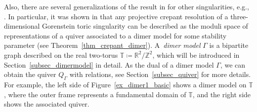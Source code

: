 \documentclass[pdftex]{sigma}
\numberwithin{equation}{section}
\theoremstyle{definition}
\newcommand{\ZZ}{\mathbb{Z}}
\newcommand{\RR}{\mathbb{R}}
\newcommand{\TT}{\mathbb{T}}
\begin{document}
Also, there are several generalizations of the result in \cite{CrawIshii} for other singularities, e.g., \cite{IU_anycrepant,Jung_CIconj,Wem_MMP}.
In particular, it was shown in \cite{IU_anycrepant} that any projective crepant resolution of a three-dimensional Gorenstein toric singularity can be
described as the moduli space of representations of a quiver associated to a dimer model for some stability parameter (see Theorem~\ref{thm_crepant_dimer}).
A~\emph{dimer model} $\Gamma$ is a bipartite graph described on the real two-torus $\TT\coloneqq\RR^2/\ZZ^2$, which will be introduced in Section~\ref{subsec_dimermodel} in detail.
As the dual of a dimer model $\Gamma$, we can obtain the quiver $Q_\Gamma$ with relations, see Section~\ref{subsec_quiver} for more details.
For example, the left side of Figure~\ref{ex_dimer1_basic} shows a dimer model on $\TT$, where the outer frame represents a fundamental domain of $\TT$, and the right side shows the associated quiver.

\newcommand{\basicdimerA}{
\foreach \n/\a/\b in {1/1.5/3, 2/3.5/3, 3/5.5/3, 4/7.5/3} {\coordinate (B\n) at (\a,\b);}
\foreach \n/\a/\b in {1/0.5/1,2/2.5/1, 3/4.5/1, 4/6.5/1} {\coordinate (W\n) at (\a,\b);}
\draw[line width=\edgewidth] (0,0) rectangle (8,4);
\foreach \w/\b in {1/1,2/2,3/3,4/3} {\draw[line width=\edgewidth] (W\w)--(B\b); };
\foreach \w/\s/\t in {1/0/2,1/0/0,1/1/0,2/2/0,2/3/0,3/4/0,3/5/0,4/6/0,4/7/0} {\draw[line width=\edgewidth] (W\w)--(\s,\t); };
\foreach \b/\s/\t in {1/1/4,1/2/4,2/3/4,2/4/4,3/5/4,3/6/4,4/7/4,4/8/4,4/8/2} {\draw[line width=\edgewidth] (B\b)--(\s,\t); };
\foreach \x in {1,2,3,4} {\filldraw [fill=black, line width=\nodewidthb] (B\x) circle [radius=\noderad] ;};
\foreach \x in {1,2,3,4} {\filldraw [fill=white, line width=\nodewidthw] (W\x) circle [radius=\noderad] ;};
}
\end{document}
